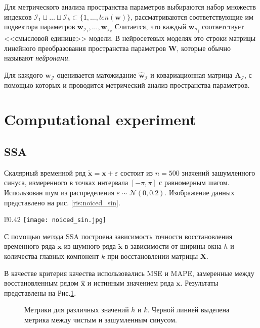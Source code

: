 \documentclass[12pt, twoside]{article}
\begin{document}
Для метрического анализа пространства параметров выбираются набор множеств индексов $\mathcal{I}_1 \sqcup \dots \sqcup \mathcal{I}_k \subset \{1, \dots, len(\mathbf{w})\}$, рассматриваются соответствующие им подвектора параметров $\mathbf{w}_{\mathcal{I}_1}, \dots, \mathbf{w}_{\mathcal{I}_k}$
Считается, что каждый $\mathbf{w}_{\mathcal{I}_j}$ соответствует <<смысловой единице>> модели. В нейросетевых моделях это строки матрицы линейного преобразования пространства параметров $\mathbf{W}$, которые обычно называют \textit{нейронами}.

Для каждого $\mathbf{w}_{\mathcal{I}}$ оценивается матожидание $\hat{\mathbf{w}}_{\mathcal{I}}$ и ковариационная матрица $\mathbf{A}_{\mathcal{I}}$, с помощью которых и проводится метрический анализ пространства параметров.


\section{Computational experiment}
\subsection{SSA}
Скалярный временной ряд $\mathbf{\tilde{x}} = \mathbf{x} + \varepsilon$ состоит из $n=500$ значений зашумленного синуса, измеренного в точках интервала $[-\pi, \pi]$ с равномерным шагом. Использован шум из распределения $\varepsilon \sim \mathcal{N}(0, 0.2)$. Изображение данных представлено на рис. \ref{ris:noiced_sin}.

\begin{wrapfigure}{l!}{0.42\textwidth}
\texttt{[image: noiced\_sin.jpg]}
\caption{Зашумленный синус.}
\label{ris:noiced_sin}
\end{wrapfigure}

С помощью метода SSA построена зависимость точности восстановления временного ряда $\mathbf{x}$ из шумного ряда $\mathbf{\tilde{x}}$ в зависимости от ширины окна $h$ и количества главных компонент $k$ при восстановлении матрицы $\mathbf{X}$.

В качестве критерия качества использовались MSE и MAPE, замеренные между восстановленным рядом $\mathbf{\hat{x}}$ и истинным значением ряда $\mathbf{x}$. Результаты представлены на Рис.\ref{fig:ssa_mse_mape}.


\begin{figure}[ht]%
    \centering
    \label{fig:ssa_mse}%
    \qquad
    \caption{Метрики для различных значений $h$ и $k$. Черной линией выделена метрика между чистым и зашумленным синусом.} 
    \label{fig:ssa_mse_mape}%
\end{figure}
\end{document}
